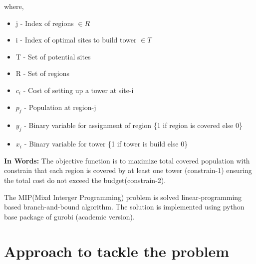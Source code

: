 \documentclass[preprint,12pt]{elsarticle}
\begin{document}
\begin{enumerate}
where,
\begin{itemize}
	\item j - Index of regions $\in R$
	\item i - Index of optimal sites to build tower $\in T$
	\item T - Set of potential sites
	\item R - Set of regions
	\item $c_i$ - Cost of setting up a tower at site-i
	\item $p_j$ - Population at region-j
	\item $y_j$ - Binary variable for assignment of region \{1 if region is covered else 0\}
	\item $x_i$ - Binary variable for tower  \{1 if tower  is build else 0\}
\end{itemize}

\subitem \textbf{In Words:}
The objective function is to maximize total covered population with constrain that each region is covered by at least one tower (constrain-1) ensuring the total cost do not exceed the budget(constrain-2).

\end{enumerate}




The MIP(Mixd Interger Programming) problem is solved  linear-programming based branch-and-bound algorithm\cite{gurobiSol}. The solution is implemented using python base package of gurobi (academic version)\cite{gurobi}.  


 
\section{Approach to tackle the problem}
\end{document}
